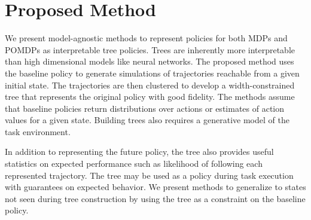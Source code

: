 \documentclass[letterpaper]{article} %
\begin{document}
\section{Proposed Method}
We present model-agnostic methods to represent policies for both MDPs and POMDPs as interpretable tree policies.
Trees are inherently more interpretable than high dimensional models like neural networks. 
The proposed method uses the baseline policy to generate simulations of trajectories reachable from a given initial state. 
The trajectories are then clustered to develop a width-constrained tree that represents the original policy with good fidelity. 
The methods assume that baseline policies return distributions over actions or estimates of action values for a given state. 
Building trees also requires a generative model of the task environment.

In addition to representing the future policy, the tree also provides useful statistics on expected performance such as likelihood of following each represented trajectory. 
The tree may be used as a policy during task execution with guarantees on expected behavior. 
We present methods to generalize to states not seen during tree construction by using the tree as a constraint on the baseline policy. 
\end{document}
